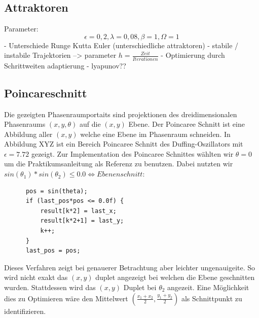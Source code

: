 \documentclass{scrartcl}
\begin{document}
\subsection { Attraktoren }
Parameter:
$$\epsilon = 0,2, \lambda = 0,08, \beta = 1, \Omega = 1$$
- Unterschiede Runge Kutta Euler (unterschiedliche attraktoren)
\newline
- stabile / instabile Trajektorien --> parameter $h = \frac{Zeit}{Iterationen}$
\newline
- Optimierung durch Schrittweiten adaptierung
\newline
- lyapunov??
\subsection{ Poincareschnitt }
Die gezeigten Phasenraumportaits sind projektionen des dreidimensionalen Phasenraums $(x,y,\theta)$ auf die $(x,y)$ Ebene. Der Poincaree Schnitt ist eine Abbildung aller $(x,y)$ welche eine Ebene im Phasenraum schneiden. In Abbildung XYZ ist ein Bereich Poincaree Schnitt des Duffing-Oszillators mit $\epsilon=7.72$ gezeigt. Zur Implementation des Poincaree Schnittes wählten wir $\theta=0$ um die Praktikumsanleitung als Referenz zu benutzen. Dabei nutzten wir $sin(\theta_1)*sin(\theta_2) \leq 0.0 \iff Ebenenschnitt$:
\begin{lstlisting}
      pos = sin(theta);
      if (last_pos*pos <= 0.0f) {
          result[k*2] = last_x;
          result[k*2+1] = last_y;
          k++;
      }
      last_pos = pos;

\end{lstlisting}
Dieses Verfahren zeigt bei genauerer Betrachtung aber leichter ungenauigeite. So wird nicht exakt das $(x,y)$ duplet angezeigt bei welchen die Ebene geschnitten wurden. Stattdessen wird das $(x,y)$ Duplet bei $\theta_2$ angezeit. Eine Möglichkeit dies zu Optimieren wäre den Mittelwert $(\frac{x_1+x_2}{2}, \frac{y_1 + y_2}{2})$ als Schnittpunkt zu identifizieren.
\end{document}
